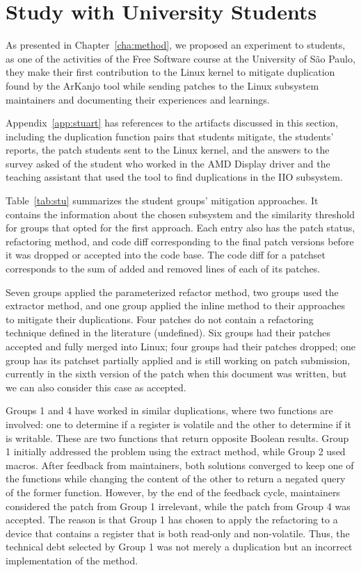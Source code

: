 \section{Study with University Students}

As presented in Chapter~\ref{cha:method}, we proposed an experiment to students, as one of the activities of the Free Software course at the University of São Paulo, they make their first contribution to the Linux kernel to mitigate duplication found by the ArKanjo tool while sending patches to the Linux subsystem maintainers and documenting their experiences and learnings.

Appendix~\ref{app:stuart} has references to the artifacts discussed in this section, 
including the duplication function pairs that students mitigate, the students’ reports, 
the patch students sent to the Linux kernel, and the answers to the survey asked 
of the student who worked in the AMD Display driver and the teaching assistant that used 
the tool to find duplications in the IIO subsystem.



Table~\ref{tab:stu} summarizes the student groups' mitigation approaches. It contains 
the information about the chosen subsystem and the similarity threshold for groups that 
opted for the first approach. Each entry also has the patch status, refactoring method, 
and code diff corresponding to the final patch versions before it was dropped or accepted 
into the code base. The code diff for a patchset corresponds to the sum of added and removed 
lines of each of its patches.

Seven groups applied the parameterized refactor method, two groups used the extractor method, and one group applied the inline method to their approaches to mitigate their duplications. Four patches do not contain a refactoring technique defined in the literature (undefined). Six groups had their patches accepted and fully merged into Linux; four groups had their patches dropped; one group has its patchset partially applied and is still working on patch submission, currently in the sixth version of the patch when this document was written, but we can also consider this case as accepted.

Groups 1 and 4 have worked in similar duplications, where two functions are involved: one to determine if a register is volatile and the other to determine if it is writable. These are two functions that return opposite Boolean results. Group 1 initially addressed the problem using the extract method, while Group 2 used macros. After feedback from maintainers, both solutions converged to keep one of the functions while changing the content of the other to return a negated query of the former function. However, by the end of the feedback cycle, maintainers considered the patch from Group 1 irrelevant, while the patch from Group 4 was accepted. The reason is that Group 1 has chosen to apply the refactoring to a device that contains a register that is both read-only and non-volatile. Thus, the technical debt selected by Group 1 was not merely a duplication but an incorrect implementation of the method.

